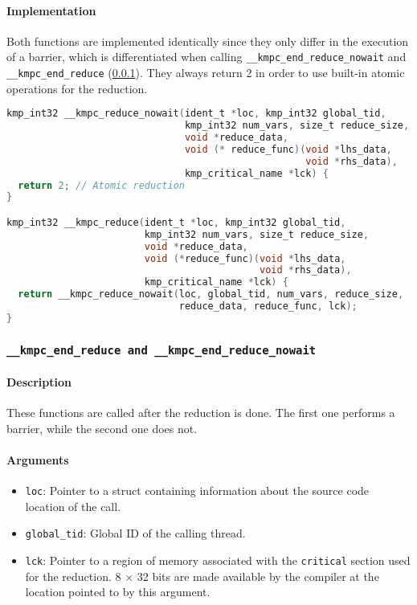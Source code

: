 \paragraph{Implementation} Both functions are implemented identically since they only differ in the
execution of a barrier, which is differentiated when calling \texttt{\_\_kmpc\_end\_reduce\_nowait}
and \texttt{\_\_kmpc\_end\_reduce} (\cref{subsubsec:kmpc-end-reduce}). They always return 2 in order
to use built-in atomic operations for the reduction.

\begin{lstlisting}[language=C, caption={__kmpc_reduce and __kmpc_reduce_nowait},
                   label={lst:kmpc-reduce}, escapechar=@]
kmp_int32 __kmpc_reduce_nowait(ident_t *loc, kmp_int32 global_tid,
                               kmp_int32 num_vars, size_t reduce_size,
                               void *reduce_data,
                               void (* reduce_func)(void *lhs_data,
                                                    void *rhs_data),
                               kmp_critical_name *lck) {
  return 2; // Atomic reduction
}

kmp_int32 __kmpc_reduce(ident_t *loc, kmp_int32 global_tid,
                        kmp_int32 num_vars, size_t reduce_size,
                        void *reduce_data,
                        void (*reduce_func)(void *lhs_data,
                                            void *rhs_data),
                        kmp_critical_name *lck) {
  return __kmpc_reduce_nowait(loc, global_tid, num_vars, reduce_size,
                              reduce_data, reduce_func, lck);
}
\end{lstlisting}

\subsubsection{\texttt{__kmpc_end_reduce and __kmpc_end_reduce_nowait}}
\label{subsubsec:kmpc-end-reduce}

\paragraph{Description} These functions are called after the reduction is done. The first one
performs a barrier, while the second one does not.

\paragraph{Arguments}
\begin{itemize}
	\item \texttt{loc}: Pointer to a struct containing information about the source code location
	      of the call.
	\item \texttt{global_tid}: Global ID of the calling thread.
	\item \texttt{lck}: Pointer to a region of memory associated with the \texttt{critical} section
	      used for the reduction. 8 $\times$ 32 bits are made available by the compiler at the
	      location pointed to by this argument.
\end{itemize}

